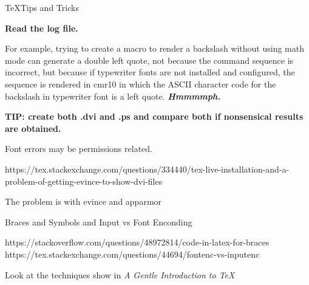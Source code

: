 \TeX Tips and Tricks

{\bf Read the log file.}

For example, trying to create a macro to render a backslash without using math mode
can generate a double left quote, not because the command sequence is incorrect,
but because if typewriter fonts are not installed and configured, the sequence
is rendered in cmr10 in which the ASCII character code for the backslash in
typewriter font is a left quote.  {\bf \it Hmmmmph.}

{\bf TIP: create both .dvi and .ps and compare both if nonsensical results are obtained.}

Font errors may be permissions related.


https://tex.stackexchange.com/questions/334440/tex-live-installation-and-a-problem-of-getting-evince-to-show-dvi-files

The problem is with evince and apparmor

Braces and Symbols and Input vs Font Enconding

https://stackoverflow.com/questions/48972814/code-in-latex-for-braces
https://tex.stackexchange.com/questions/44694/fontenc-vs-inputenc

Look at the techniques show in {\it A Gentle Introduction to \TeX}

\def\\{\char92{}}          %
\def\lb{\char'173{}}       %
\def\rb{\char'175{}}       %
\def\sp{\char32{}}         %
 
\def\beginliteral{ 
\vskip\baselineskip 
\begingroup 
\tt 
\obeylines 
\catcode`\@=0 
\parskip=0pt\parindent=0pt 
\catcode`\$=12\catcode`\&=12\catcode`\^=12\catcode`\#=12 
\catcode`\_=12\catcode`\~=12 
\def\par{\leavevmode\endgraf} 
\catcode`\{=12\catcode`\}=12\catcode`\%=12\catcode`\\=12 
} 
 
\def\endliteral{\endgroup} 
 

